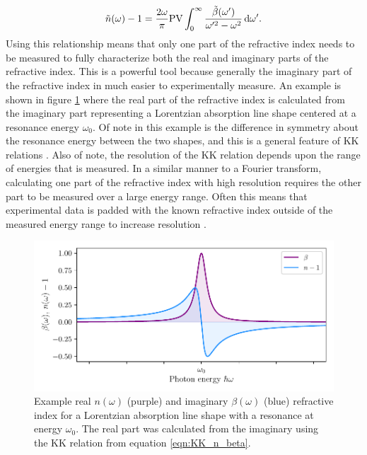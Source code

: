 \begin{equation}
	\label{eqn:KK_n_beta}
	\tilde{n}(\omega) - 1 = \frac{2\omega}{\pi}\mathrm{PV}\int_{0}^{\infty} \frac{\tilde{\beta}(\omega')}{\omega'^2 - \omega^2} \mathop{}\!\mathrm{d} \omega'.
\end{equation}
Using this relationship means that only one part of the refractive index needs to be measured to fully characterize both the real and imaginary parts of the refractive index.  This is a powerful tool because generally the imaginary part of the refractive index in much easier to experimentally measure.  An example is shown in figure \ref{fig:KK_example} where the real part of the refractive index is calculated from the imaginary part representing a Lorentzian absorption line shape centered at a resonance energy $\omega_0$.  Of note in this example is the difference in symmetry about the resonance energy between the two shapes, and this is a general feature of KK relations \cite{lucariniKramersKronigRelationsOptical2005}.  Also of note, the resolution of the KK relation depends upon the range of energies that is measured.  In a similar manner to a Fourier transform, calculating one part of the refractive index with high resolution requires the other part to be measured over a large energy range.  Often this means that experimental data is padded with the known refractive index outside of the measured energy range to increase resolution \cite{kaplanRetrievalComplexvaluedRefractive2019}.

\begin{figure}
	\centering
	\includegraphics[width=1.0\textwidth]{figures/CATS/KK_example.pdf}
	\caption[Example real and imaginary refractive index calculated using KK relations]{Example real $n(\omega)$ (purple) and imaginary $\beta(\omega)$ (blue) refractive index for a Lorentzian absorption line shape with a resonance at energy $\omega_0$.  The real part was calculated from the imaginary using the KK relation from equation \ref{eqn:KK_n_beta}.}
	\label{fig:KK_example}
\end{figure}



